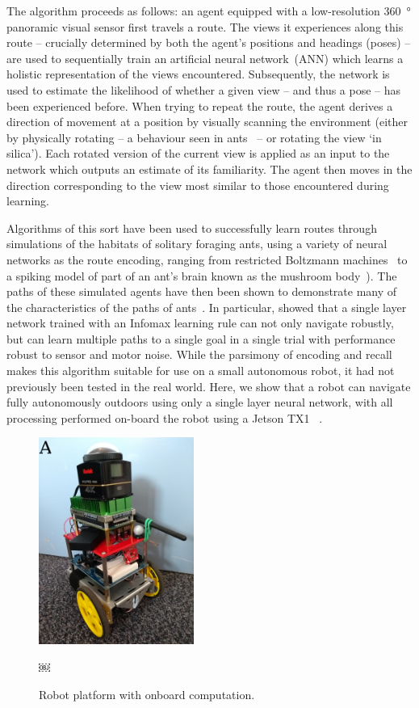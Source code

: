 \documentclass[letterpaper]{article}
\begin{document}
The algorithm proceeds as follows: an agent equipped with a low-resolution \SI{360}{\degree} panoramic visual sensor first travels a route. 
The views it experiences along this route -- crucially determined by both the agent’s positions and headings (poses) -- are used to sequentially train an artificial neural network~(ANN) which learns a holistic representation of the views encountered. Subsequently, the network is used to estimate the likelihood of whether a given view -- and thus a pose -- has been experienced before. 
When trying to repeat the route, the agent derives a direction of movement at a position by visually scanning the environment (either by physically rotating -- a behaviour seen in ants~\citep{Wystrach2014} -- or rotating the view `in silica').
Each rotated version of the current view is applied as an input to the network which outputs an estimate of its familiarity.
The agent then moves in the direction corresponding to the view most similar to those encountered during learning. 

Algorithms of this sort have been used to successfully learn routes through simulations of the habitats of solitary foraging ants, using a variety of neural networks as the route encoding, ranging from restricted Boltzmann machines~\citep{Baddeley2011models} to a spiking model of part of an ant’s brain known as the mushroom body~\citep{Ardin2016}).
The paths of these simulated agents have then been shown to demonstrate many of the characteristics of the paths of ants~\citep{Wystrach2013}. 
In particular, \citet{Baddeley2012} showed that a single layer network trained with an Infomax learning rule can not only navigate robustly, but can learn multiple paths to a single goal in a single trial with performance robust to sensor and motor noise. 
While the parsimony of encoding and recall makes this algorithm suitable for use on a small autonomous robot, it had not previously been tested in the real world. 
Here, we show that a robot can navigate fully autonomously outdoors using only a single layer neural network, with all processing performed on-board the robot using a Jetson TX1~\citep{NVIDIACorporation2016} .

\begin{figure}[t]
    \centering
    \includegraphics[width=2in]{figures/robot.jpg}
    \caption{Robot platform with onboard computation.}￼
    \label{fig:robot}
\end{figure}
\end{document}
